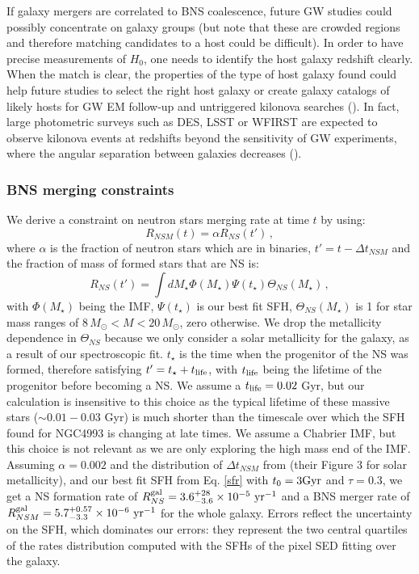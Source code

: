 If galaxy mergers are correlated to BNS coalescence, future GW studies could possibly concentrate on galaxy groups (but note that these are crowded regions and therefore matching candidates to a host could be difficult). In order to have precise measurements of $H_0$, one needs to identify the host galaxy redshift clearly. When the match is clear, the properties of the type of host galaxy found could help future studies to select the right host galaxy or create galaxy catalogs of likely hosts for GW EM follow-up and untriggered kilonova searches (\citealt{doctor}). In fact, large photometric surveys such as DES, LSST or WFIRST are expected to observe kilonova events at redshifts beyond the sensitivity of GW experiments, where the angular separation between galaxies decreases (\citealt{scolnic}).


\subsubsection{BNS merging constraints}
We derive a constraint on neutron stars merging rate at time $t$ by using:
\begin{equation}
R_{NSM}(t) = \alpha R_{NS}(t')\, ,\label{rate}
\end{equation}
where $\alpha$ is the fraction of neutron stars which are in binaries, $t' = t-\Delta t_{NSM}$ and the fraction of mass of formed stars that are NS is: 
\begin{equation}
R_{NS}(t') = \int dM_\star \Phi(M_\star)\Psi(t_\star)\Theta_{NS}(M_\star)\, ,
\end{equation}
with $\Phi(M_\star)$ being the IMF, $\Psi(t_\star)$ is our best fit SFH, $\Theta_{NS}(M_\star)$ is 1 for star mass ranges of $8\, M_\odot<M<20 \,M_\odot$, zero otherwise. We drop the metallicity dependence in $\Theta_{NS}$ because we only consider a solar metallicity for the galaxy, as a result of our spectroscopic fit. $t_\star$ is the time when the progenitor of the NS was formed, therefore satisfying $t' = t_\star+t_{\rm life}$, with $t_{\rm life}$ being the lifetime of the progenitor before becoming a NS. We assume a $t_{\rm life}=0.02$ Gyr, but our calculation is insensitive to this choice as the typical lifetime of these massive stars ($\sim 0.01-0.03$ Gyr) is much shorter than the timescale over which the SFH found for NGC4993 is changing at late times.
We assume a Chabrier IMF, but this choice is not relevant as  we are only exploring the high mass end of the IMF. Assuming $\alpha=0.002$ and the distribution of $\Delta t_{NSM}$ from \citet{vangioni} (their Figure 3 for solar metallicity), and our best fit SFH from Eq. \ref{sfr} with $t_0=3 {\rm Gyr}$ and $\tau=0.3$, we get a NS formation rate of $R_{NS}^{\rm gal}= 3.6^{+28}_{-3.6} \times 10^{-5} ~{\rm yr}^{-1}$ and a BNS merger rate of $R_{NSM}^{\rm gal}= 5.7^{+0.57}_{-3.3} \times 10^{-6} ~{\rm yr}^{-1}$ for the whole galaxy. Errors reflect the uncertainty on the SFH, which dominates our errors: they represent the two central quartiles of the rates distribution computed with the SFHs of the pixel SED fitting over the galaxy.

